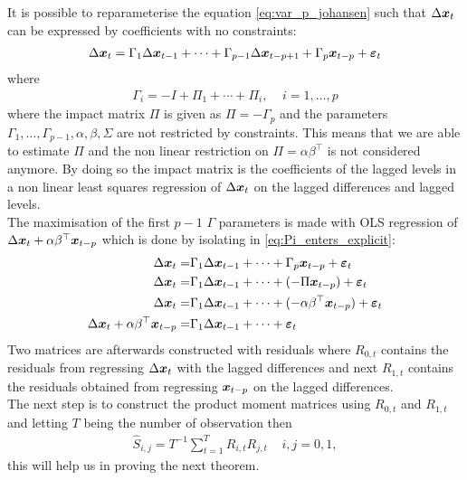 \noindent It is possible to reparameterise the equation \eqref{eq:var_p_johansen} such that $\Delta \boldsymbol{x}_t$ can be expressed by coefficients with no constraints:
\begin{align}\label{eq:Pi_enters_explicit}
    \Delta \boldsymbol{x}_t=\Gamma_1\Delta \boldsymbol{x}_{t-1}+\cdots+\Gamma_{p-1}\Delta \boldsymbol{x}_{t-p+1}+\Gamma_{p}\boldsymbol{x}_{t-p}+\boldsymbol{\varepsilon}_t
\end{align}
where 
\begin{align*}
    \Gamma_i=-I+\Pi_1+\cdots+\Pi_i,\;\;\;\; i=1,\ldots,p
\end{align*}
where the impact matrix $\Pi$ is given as $\Pi=-\Gamma_p$ and the parameters $\Gamma_1,\ldots,\Gamma_{p-1},\alpha,\beta,\Sigma$ are not restricted by constraints. This means that we are able to estimate $\Pi$ and the non linear restriction on $\Pi=\alpha\beta^\top$ is not considered anymore. By doing so the impact matrix is the coefficients of the lagged levels in a non linear least squares regression of $\Delta \boldsymbol{x}_t$ on the lagged differences and lagged levels.\\
\noindent The maximisation of the first $p-1$ $\Gamma$ parameters is made with OLS regression of $\Delta \boldsymbol{x}_t+\alpha\beta^\top \boldsymbol{x}_{t-p}$ which is done by isolating in \eqref{eq:Pi_enters_explicit}:
\begin{align}
    \Delta \boldsymbol{x}_t=&\Gamma_1\Delta \boldsymbol{x}_{t-1}+\cdots+\Gamma_{p}\boldsymbol{x}_{t-p}+\boldsymbol{\varepsilon}_t\\
    \Delta \boldsymbol{x}_t=&\Gamma_1\Delta \boldsymbol{x}_{t-1}+\cdots+(-\Pi \boldsymbol{x}_{t-p})+\boldsymbol{\varepsilon}_t\\
    \Delta \boldsymbol{x}_t=&\Gamma_1\Delta \boldsymbol{x}_{t-1}+\cdots+(-\alpha\beta^\top \boldsymbol{x}_{t-p})+\boldsymbol{\varepsilon}_t\\
    \Delta \boldsymbol{x}_t+\alpha\beta^\top \boldsymbol{x}_{t-p}=&\Gamma_1\Delta \boldsymbol{x}_{t-1}+\cdots+\boldsymbol{\varepsilon}_t
\end{align}
Two matrices are afterwards constructed with residuals where $R_{0,t}$ contains the residuals from regressing $\Delta \boldsymbol{x}_t$ with the lagged differences and next $R_{1,t}$ contains the residuals obtained from regressing $\boldsymbol{x}_{t-p}$ on the lagged differences.\\
The next step is to construct the product moment matrices using $R_{0,t}$ and $R_{1,t}$ and letting $T$ being the number of observation then
\begin{align}\label{eq:prod_mom_mat}
\hat{S}_{i,j}=T^{-1}\sum_{t=1}^
T R_{i,t}R_{j,t}\;\;\;\; i,j=0,1,
\end{align}
this will help us in proving the next theorem.
